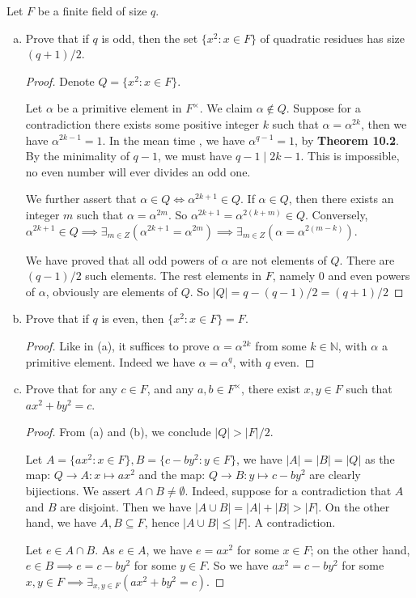 \documentclass[12pt,letterpaper]{article}
\def\N{{\mathbb N}}
\def\prob#1{\vskip13pt\noindent\llap{{\bf #1:\ }}}
\newcommand{\paren}[1]{\left(#1\right)}
\begin{document}
\pagebreak

\prob4 Let $F$ be a finite field of size $q$.
\begin{enumerate}[(a)]
    \item Prove that if $q$ is odd, then the set $\{x^2\colon x\in F\}$ of quadratic residues has size $(q+1)/2$.
    \begin{proof}
    	Denote $Q= \{x^2\colon x\in F\}$.
    	
    	Let $\alpha$ be a primitive element in $F^\times$. We claim $\alpha\notin Q$. Suppose for a contradiction there exists some positive integer $k$ such that $\alpha = \alpha^{2k}$, then we have $\alpha^{2k-1}=1$. In the mean time , we have $\alpha^{q-1}=1$, by \textbf{Theorem 10.2}. By the minimality of $q-1$, we must have $q-1 \mid 2k-1$. This is impossible, no even number will ever divides an odd one.
    	
    	We further assert that $\alpha\in Q \iff \alpha^{2k+1}\in Q$. If $\alpha\in Q$, then there exists an integer $m$ such that $\alpha=\alpha^{2m}$. So $\alpha^{2k+1}=\alpha^{2(k+m)}\in Q$. Conversely, $\alpha^{2k+1}\in Q\implies \exists_{m\in Z}\paren{\alpha^{2k+1}=\alpha^{2m}}\implies \exists_{m\in Z}\paren{\alpha=\alpha^{2(m-k)}}$.
    	
    	We have proved that all odd powers of $\alpha$ are not elements of $Q$. There are $(q-1)/2$ such elements. The rest elements in $F$, namely $0$ and even powers of $\alpha$, obviously are elements of $Q$. So $|Q|=q-(q-1)/2=(q+1)/2$
    	
    \end{proof}
    \item  Prove that if $q$ is even, then $\{x^2\colon x\in F\} = F.$
   	\begin{proof}
   		Like in (a), it suffices to prove $\alpha = \alpha^{2k}$ from some $k\in \N$, with $\alpha$ a primitive element. Indeed we have $\alpha = \alpha^q$, with $q$ even.
   		
   	\end{proof}
    \item Prove that for any $c\in F$, and any $a,b\in F^\times$, there exist $x,y\in F$ such that $ax^2 + by^2 = c$.
	\begin{proof}
		From (a) and (b), we conclude $|Q|>|F|/2$.
		
		Let $A = \{ax^2: x\in F\}, B=\{c-by^2: y\in F\}$, we have $|A|=|B|=|Q|$ as the map: $Q\to A: x\mapsto ax^2$ and the map: $Q\to B: y\mapsto c-by^2$ are clearly bijiections. We assert $A\cap B\ne \emptyset$. Indeed,  suppose for a contradiction that $A$ and $B$ are disjoint. Then we have $|A\cup B|=|A|+|B|>|F|$. On the other hand, we have $A, B\subseteq F$, hence $|A\cup B|\le |F|$. A contradiction.
		
		Let $e\in A\cap B$. As $e\in A$, we have $e=ax^2$ for some $x\in F$; on the other hand, $e\in B\implies e=c-by^2$ for some $y\in F$. So we have $ax^2=c-by^2$ for some $x,y\in F\implies \exists_{x,y\in F}(ax^2+by^2=c)$. 
	\end{proof}

\end{enumerate}
\end{document}
